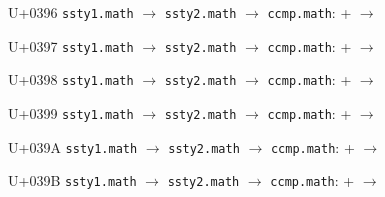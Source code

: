\documentclass{article}
\begin{document}
\begin{substitutions}
\goodbreak

U+0396  \linebreak
    \texttt{ssty1.math} $\to$  \linebreak
    \texttt{ssty2.math} $\to$  \linebreak
\texttt{ccmp.math}:
\linebreak\null\quad{} \space +  \space $\to$  

\goodbreak

U+0397  \linebreak
    \texttt{ssty1.math} $\to$  \linebreak
    \texttt{ssty2.math} $\to$  \linebreak
\texttt{ccmp.math}:
\linebreak\null\quad{} \space +  \space $\to$  

\goodbreak

U+0398  \linebreak
    \texttt{ssty1.math} $\to$  \linebreak
    \texttt{ssty2.math} $\to$  \linebreak
\texttt{ccmp.math}:
\linebreak\null\quad{} \space +  \space $\to$  

\goodbreak

U+0399  \linebreak
    \texttt{ssty1.math} $\to$  \linebreak
    \texttt{ssty2.math} $\to$  \linebreak
\texttt{ccmp.math}:
\linebreak\null\quad{} \space +  \space $\to$  

\goodbreak

U+039A  \linebreak
    \texttt{ssty1.math} $\to$  \linebreak
    \texttt{ssty2.math} $\to$  \linebreak
\texttt{ccmp.math}:
\linebreak\null\quad{} \space +  \space $\to$  

\goodbreak

U+039B  \linebreak
    \texttt{ssty1.math} $\to$  \linebreak
    \texttt{ssty2.math} $\to$  \linebreak
\texttt{ccmp.math}:
\linebreak\null\quad{} \space +  \space $\to$  


\end{substitutions}
\end{document}
